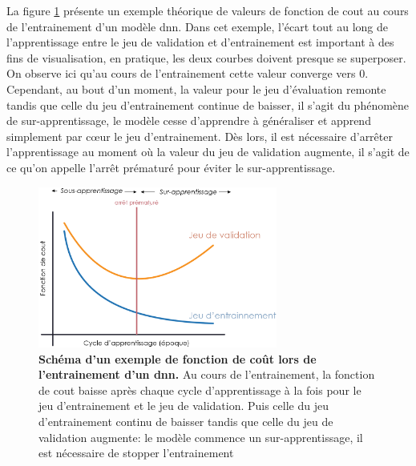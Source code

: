 La figure \ref{fig:loss_func} présente un exemple théorique de valeurs de fonction de cout au cours de l'entrainement d'un modèle \gls{dnn}. Dans cet exemple, l'écart tout au long de l'apprentissage entre le jeu de validation et d'entrainement est important à des fins de visualisation, en pratique, les deux courbes doivent presque se superposer. On observe ici qu'au cours de l'entrainement cette valeur converge vers 0. Cependant, au bout d'un moment, la valeur pour le jeu d'évaluation remonte tandis que celle du jeu d'entrainement continue de baisser, il s'agit du phénomène de sur-apprentissage, le modèle cesse d'apprendre à généraliser et apprend simplement par cœur le jeu d'entrainement. Dès lors, il est nécessaire d'arrêter l'apprentissage au moment où la valeur du jeu de validation augmente, il s'agit de ce qu'on appelle l'arrêt prématuré pour éviter le sur-apprentissage.
\begin{figure}[!ht]
 \centering
 \includegraphics[width=0.7\textwidth]{figures/loss_function.png}
 \caption[Schéma d'un exemple de fonction de coût lors d'un entraînement]{\textbf{Schéma d'un exemple de fonction de coût lors de l'entrainement d'un \gls{dnn}.} Au cours de l'entrainement, la fonction de cout baisse après chaque cycle d'apprentissage à la fois pour le jeu d'entrainement et le jeu de validation. Puis celle du jeu d'entrainement continu de baisser tandis que celle du jeu de validation augmente: le modèle commence un sur-apprentissage, il est nécessaire de stopper l'entrainement}
 \label{fig:loss_func}
\end{figure}

